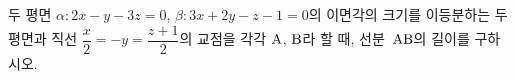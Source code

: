 두 평면 $\alpha\colon 2x-y-3z=0$, $\beta\colon 3x+2y-z-1=0$의 이면각의 크기를 이등분하는 두 평면과 직선 $\dfrac{x}{2}=-y=\dfrac{z+1}{2}$의 교점을 각각 $\mathrm{A}$, $\mathrm{B}$라 할 때, 선분~$\mathrm{AB}$의 길이를 구하시오.
